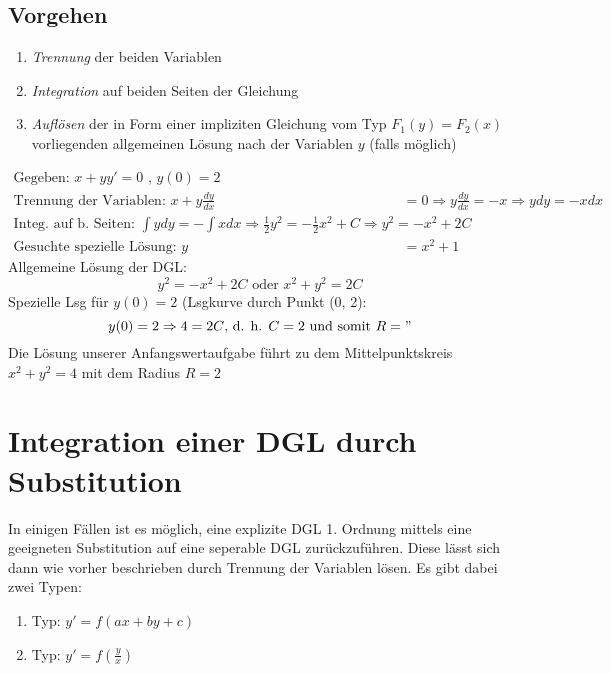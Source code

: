 \subsection{Vorgehen}
\begin{enumerate}
	\item \textit{Trennung} der beiden Variablen
	\item \textit{Integration} auf beiden Seiten der Gleichung
	\item \textit{Auflösen} der in Form einer impliziten Gleichung vom Typ $F_1(y) = F_2(x)$ vorliegenden allgemeinen Lösung nach der Variablen $y$ (falls möglich)
\end{enumerate}

\begin{bsp}
\begin{align*}
	 \text{Gegeben: }x + yy' = 0\text{ , } y(0) = 2\\
	  \text{Trennung der Variablen: } x+y \frac{dy}{dx} &= 0 \Rightarrow y\frac{dy}{dx} = -x \Rightarrow y dy = -x dx \\
	  \text{Integ. auf b. Seiten: } \int y dy = - \int x dx \Rightarrow \frac{1}{2}y^2 = - \frac{1}{2}x^2 + C \Rightarrow y^2 = -x^2 + 2C \\
	  \text{Gesuchte spezielle Lösung: } y &= x^2 + 1
\end{align*}
Allgemeine Lösung der DGL:
	 $$y^2 = -x ^2 + 2 C \text{      oder      } x^2 + y^2 = 2C$$
Spezielle Lsg für $y(0) = 2$ (Lsgkurve durch Punkt (0, 2):
$$y(0) = 2 \Rightarrow 4 = 2C \text{, d. h. } C = 2 \text{ und somit } R = "$$
Die Lösung unserer Anfangswertaufgabe führt zu dem Mittelpunktskreis $x^2 + y^2 = 4$ mit dem Radius $R = 2$
\end{bsp}

\section{Integration einer DGL durch Substitution}
In einigen Fällen ist es möglich, eine explizite DGL 1. Ordnung mittels eine geeigneten Substitution auf eine seperable DGL zurückzuführen. Diese lässt sich dann wie vorher beschrieben durch Trennung der Variablen lösen. Es gibt dabei zwei Typen:
\begin{enumerate}
	\item Typ: $y' = f(ax + by + c)$
	\item Typ: $y' = f(\frac{y}{x})$
\end{enumerate}

